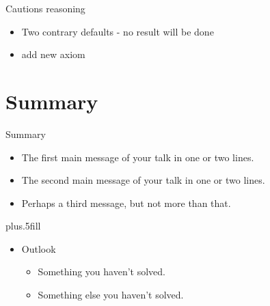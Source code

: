 \documentclass{beamer}
\begin{document}
\begin{frame}{Cautions reasoning}
  \begin{itemize}
    \item Two contrary defaults - no result will be done
    \item add new axiom
  \end{itemize}
\end{frame}





\section*{Summary}

\begin{frame}{Summary}

  \begin{itemize}
  \item
    The \alert{first main message} of your talk in one or two lines.
  \item
    The \alert{second main message} of your talk in one or two lines.
  \item
    Perhaps a \alert{third message}, but not more than that.
  \end{itemize}
  
  \vskip0pt plus.5fill
  \begin{itemize}
  \item
    Outlook
    \begin{itemize}
    \item
      Something you haven't solved.
    \item
      Something else you haven't solved.
    \end{itemize}
  \end{itemize}
\end{frame}
\end{document}
